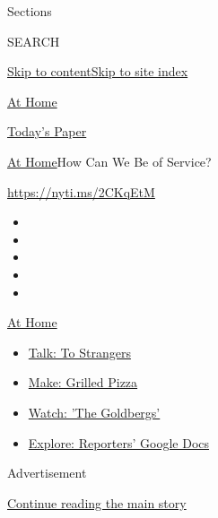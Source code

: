 Sections

SEARCH

\protect\hyperlink{site-content}{Skip to
content}\protect\hyperlink{site-index}{Skip to site index}

\href{https://www.nytimes.com/spotlight/at-home}{At Home}

\href{https://myaccount.nytimes.com/auth/login?response_type=cookie\&client_id=vi}{}

\href{https://www.nytimes.com/section/todayspaper}{Today's Paper}

\href{/spotlight/at-home}{At Home}\textbar{}How Can We Be of Service?

\url{https://nyti.ms/2CKqEtM}

\begin{itemize}
\item
\item
\item
\item
\item
\end{itemize}

\href{https://www.nytimes.com/spotlight/at-home?action=click\&pgtype=Article\&state=default\&region=TOP_BANNER\&context=at_home_menu}{At
Home}

\begin{itemize}
\tightlist
\item
  \href{https://www.nytimes.com/2020/08/03/well/family/the-benefits-of-talking-to-strangers.html?action=click\&pgtype=Article\&state=default\&region=TOP_BANNER\&context=at_home_menu}{Talk:
  To Strangers}
\item
  \href{https://www.nytimes.com/2020/08/01/at-home/coronavirus-make-pizza-on-a-grill.html?action=click\&pgtype=Article\&state=default\&region=TOP_BANNER\&context=at_home_menu}{Make:
  Grilled Pizza}
\item
  \href{https://www.nytimes.com/2020/07/31/arts/television/goldbergs-abc-stream.html?action=click\&pgtype=Article\&state=default\&region=TOP_BANNER\&context=at_home_menu}{Watch:
  'The Goldbergs'}
\item
  \href{https://www.nytimes.com/interactive/2020/at-home/even-more-reporters-editors-diaries-lists-recommendations.html?action=click\&pgtype=Article\&state=default\&region=TOP_BANNER\&context=at_home_menu}{Explore:
  Reporters' Google Docs}
\end{itemize}

Advertisement

\protect\hyperlink{after-top}{Continue reading the main story}

